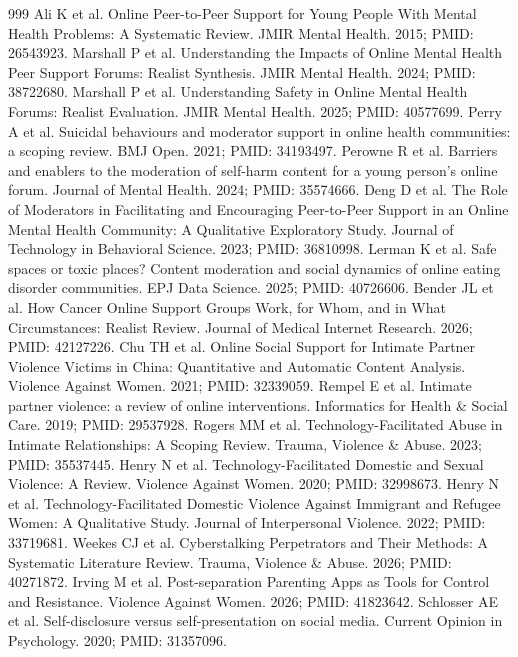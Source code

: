 \begin{thebibliography}{999}
 Ali K et al. Online Peer-to-Peer Support for Young People With Mental Health Problems: A Systematic Review. JMIR Mental Health. 2015; PMID: 26543923.
 Marshall P et al. Understanding the Impacts of Online Mental Health Peer Support Forums: Realist Synthesis. JMIR Mental Health. 2024; PMID: 38722680.
 Marshall P et al. Understanding Safety in Online Mental Health Forums: Realist Evaluation. JMIR Mental Health. 2025; PMID: 40577699.
 Perry A et al. Suicidal behaviours and moderator support in online health communities: a scoping review. BMJ Open. 2021; PMID: 34193497.
 Perowne R et al. Barriers and enablers to the moderation of self-harm content for a young person's online forum. Journal of Mental Health. 2024; PMID: 35574666.
 Deng D et al. The Role of Moderators in Facilitating and Encouraging Peer-to-Peer Support in an Online Mental Health Community: A Qualitative Exploratory Study. Journal of Technology in Behavioral Science. 2023; PMID: 36810998.
 Lerman K et al. Safe spaces or toxic places? Content moderation and social dynamics of online eating disorder communities. EPJ Data Science. 2025; PMID: 40726606.
 Bender JL et al. How Cancer Online Support Groups Work, for Whom, and in What Circumstances: Realist Review. Journal of Medical Internet Research. 2026; PMID: 42127226.
 Chu TH et al. Online Social Support for Intimate Partner Violence Victims in China: Quantitative and Automatic Content Analysis. Violence Against Women. 2021; PMID: 32339059.
 Rempel E et al. Intimate partner violence: a review of online interventions. Informatics for Health \& Social Care. 2019; PMID: 29537928.
 Rogers MM et al. Technology-Facilitated Abuse in Intimate Relationships: A Scoping Review. Trauma, Violence \& Abuse. 2023; PMID: 35537445.
 Henry N et al. Technology-Facilitated Domestic and Sexual Violence: A Review. Violence Against Women. 2020; PMID: 32998673.
 Henry N et al. Technology-Facilitated Domestic Violence Against Immigrant and Refugee Women: A Qualitative Study. Journal of Interpersonal Violence. 2022; PMID: 33719681.
 Weekes CJ et al. Cyberstalking Perpetrators and Their Methods: A Systematic Literature Review. Trauma, Violence \& Abuse. 2026; PMID: 40271872.
 Irving M et al. Post-separation Parenting Apps as Tools for Control and Resistance. Violence Against Women. 2026; PMID: 41823642.
 Schlosser AE et al. Self-disclosure versus self-presentation on social media. Current Opinion in Psychology. 2020; PMID: 31357096.


\end{thebibliography}
